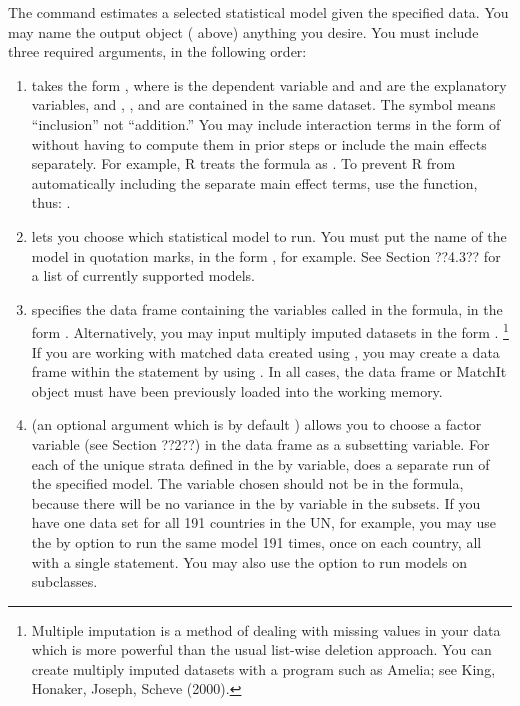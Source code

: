 \documentclass[letterpaper,10pt,english]{sphinxmanual}
\begin{document}
The  command estimates a selected statistical model given the specified data.
You may name the output object ( above) anything you desire. You must include
three required arguments, in the following order:
\begin{enumerate}
\item {} 
 takes the form , where  is the dependent variable and 
and  are the explanatory variables, and , , and  are contained in the
same dataset. The \code{+} symbol means “inclusion” not “addition.” You may include
interaction terms in the form of  without having to compute them in prior
steps or include the main effects separately. For example, R treats the formula  as . To prevent R from automatically including
the separate main effect terms, use the  function, thus: .

\item {} 
 lets you choose which statistical model to run. You must put the name
of the model in quotation marks, in the form , for example. See
Section ??4.3?? for a list of currently supported models.

\item {} 
 specifies the data frame containing the variables called in the formula, in the
form . Alternatively, you may input multiply imputed datasets in
the form . \footnote{
Multiple imputation is a method of dealing with missing values in your data which is more powerful
than the usual list-wise deletion approach. You can create multiply imputed datasets with a program such
as Amelia; see King, Honaker, Joseph, Scheve (2000).
} If you are working with matched
data created using , you may create a data frame within the 
statement by using . In all cases, the data frame or
MatchIt object must have been previously loaded into the working memory.

\item {} 
 (an optional argument which is by default ) allows you to choose a factor
variable (see Section ??2??) in the data frame as a subsetting variable. For each of
the unique strata defined in the by variable,  does a separate run of the
specified model. The variable chosen should not be in the formula, because there
will be no variance in the by variable in the subsets. If you have one data set for
all 191 countries in the UN, for example, you may use the by option to run the
same model 191 times, once on each country, all with a single  statement.
You may also use the  option to run models on  subclasses.


\end{enumerate}
\end{document}
